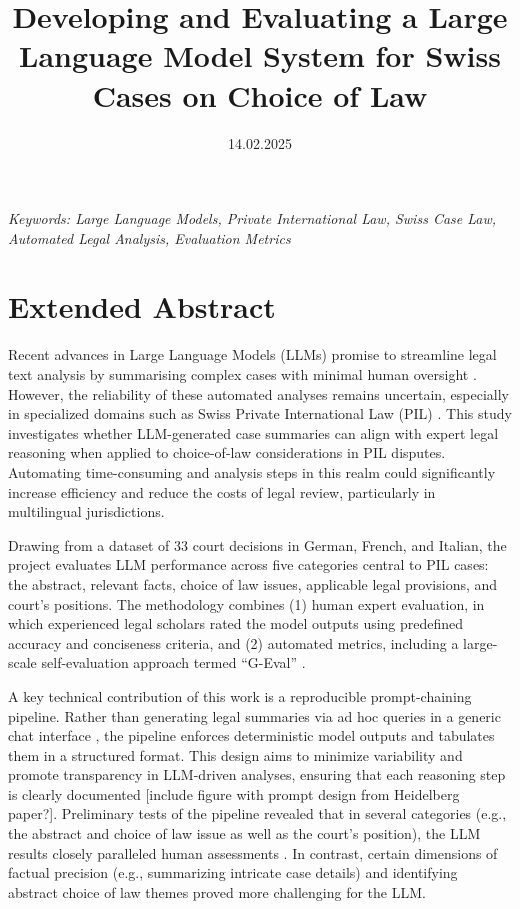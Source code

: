 \documentclass[a4paper,12pt]{article}
\title{Developing and Evaluating a Large Language Model System for Swiss Cases on Choice of Law}
\date{14.02.2025}
\begin{document}
\maketitle
\thispagestyle{fancy}

\begin{center}
\textit{Keywords: Large Language Models, Private International Law, Swiss Case Law, Automated Legal Analysis, Evaluation Metrics}
\newline
\end{center}

\section*{Extended Abstract}

Recent advances in Large Language Models (LLMs) promise to streamline legal text analysis by summarising complex cases with minimal human oversight \parencite{pereira_inacia_2024}. However, the reliability of these automated analyses remains uncertain, especially in specialized domains such as Swiss Private International Law (PIL) \parencite{anon_2025}. This study investigates whether LLM-generated case summaries can align with expert legal reasoning when applied to choice-of-law considerations in PIL disputes. Automating time-consuming and analysis steps in this realm could significantly increase efficiency and reduce the costs of legal review, particularly in multilingual jurisdictions.

Drawing from a dataset of 33 court decisions in German, French, and Italian, the project evaluates LLM performance across five categories central to PIL cases: the abstract, relevant facts, choice of law issues, applicable legal provisions, and court's positions. The methodology combines (1) human expert evaluation, in which experienced legal scholars rated the model outputs using predefined accuracy and conciseness criteria, and (2) automated metrics, including a large-scale self-evaluation approach termed ``G-Eval'' \parencite{liu2023gevalnlgevaluationusing}.

A key technical contribution of this work is a reproducible prompt-chaining pipeline. Rather than generating legal summaries via ad hoc queries in a generic chat interface \parencite{qin_is_2023}, the pipeline enforces deterministic model outputs \parencite{} and tabulates them in a structured format. This design aims to minimize variability and promote transparency in LLM-driven analyses, ensuring that each reasoning step is clearly documented [include figure with prompt design from Heidelberg paper?]. Preliminary tests of the pipeline revealed that in several categories (e.g., the abstract and choice of law issue as well as the court's position), the LLM results closely paralleled human assessments \parencite{anon_2025 [ask AB, which categories were particularly good/bad]}. In contrast, certain dimensions of factual precision (e.g., summarizing intricate case details) and identifying abstract choice of law themes proved more challenging for the LLM.
\end{document}
